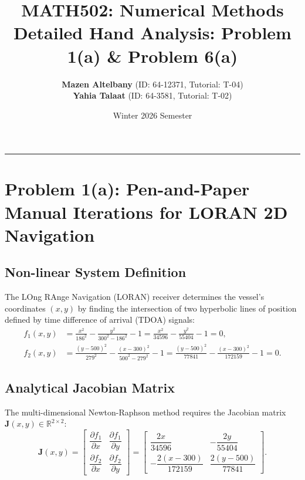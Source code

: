 \documentclass[11pt,a4paper]{article}
\title{\textbf{MATH502: Numerical Methods}\\[0.3em]
\Large Detailed Hand Analysis: Problem 1(a) \& Problem 6(a)}
\author{\textbf{Mazen Altelbany} (ID: 64-12371, Tutorial: T-04) \\
\textbf{Yahia Talaat} (ID: 64-3581, Tutorial: T-02)}
\date{Winter 2026 Semester}
\begin{document}
\maketitle

\hrule
\vspace{1em}

\section{Problem 1(a): Pen-and-Paper Manual Iterations for LORAN 2D Navigation}

\subsection{Non-linear System Definition}
The LOng RAnge Navigation (LORAN) receiver determines the vessel's coordinates $(x, y)$ by finding the intersection of two hyperbolic lines of position defined by time difference of arrival (TDOA) signals:
\begin{align}
    f_1(x, y) &= \frac{x^2}{186^2} - \frac{y^2}{300^2 - 186^2} - 1 = \frac{x^2}{34596} - \frac{y^2}{55404} - 1 = 0, \label{eq:f1} \\
    f_2(x, y) &= \frac{(y - 500)^2}{279^2} - \frac{(x - 300)^2}{500^2 - 279^2} - 1 = \frac{(y - 500)^2}{77841} - \frac{(x - 300)^2}{172159} - 1 = 0. \label{eq:f2}
\end{align}

\subsection{Analytical Jacobian Matrix}
The multi-dimensional Newton-Raphson method requires the Jacobian matrix $\mathbf{J}(x, y) \in \mathbb{R}^{2 \times 2}$:
\begin{equation}
    \mathbf{J}(x, y) = 
    \begin{bmatrix}
        \dfrac{\partial f_1}{\partial x} & \dfrac{\partial f_1}{\partial y} \\[1em]
        \dfrac{\partial f_2}{\partial x} & \dfrac{\partial f_2}{\partial y}
    \end{bmatrix}
    =
    \begin{bmatrix}
        \dfrac{2x}{34596} & -\dfrac{2y}{55404} \\[1em]
        -\dfrac{2(x - 300)}{172159} & \dfrac{2(y - 500)}{77841}
    \end{bmatrix}.
\end{equation}
\end{document}
